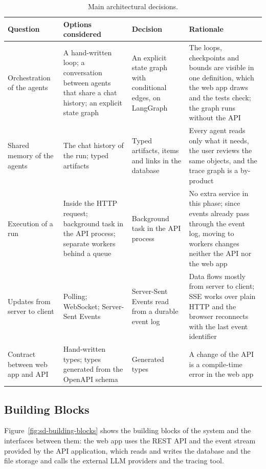 \begin{table}[H]
    \centering
    \caption{Main architectural decisions.}
    \label{tab:sd-adr}
    \begin{tabularx}{\linewidth}{|p{2.4cm}|X|X|X|}
        \hline
        \textbf{Question} & \textbf{Options considered} & \textbf{Decision} & \textbf{Rationale} \\
        \hline
        Orchestration of the agents & A hand-written loop; a conversation between agents that share a chat history; an explicit state graph & An explicit state graph with conditional edges, on LangGraph & The loops, checkpoints and bounds are visible in one definition, which the web app draws and the tests check; the graph runs without the API \\
        \hline
        Shared memory of the agents & The chat history of the run; typed artifacts & Typed artifacts, items and links in the database & Every agent reads only what it needs, the user reviews the same objects, and the trace graph is a by-product \\
        \hline
        Execution of a run & Inside the HTTP request; background task in the API process; separate workers behind a queue & Background task in the API process & No extra service in this phase; since events already pass through the event log, moving to workers changes neither the API nor the web app \\
        \hline
        Updates from server to client & Polling; WebSocket; Server-Sent Events & Server-Sent Events read from a durable event log & Data flows mostly from server to client; SSE works over plain HTTP and the browser reconnects with the last event identifier \\
        \hline
        Contract between web app and API & Hand-written types; types generated from the OpenAPI schema & Generated types & A change of the API is a compile-time error in the web app \\
        \hline
    \end{tabularx}
\end{table}

\subsection{Building Blocks}
\label{sec:sd-building-blocks}

Figure~\ref{fig:sd-building-blocks} shows the building blocks of the system and the interfaces between them: the web app uses the REST API and the event stream provided by the API application, which reads and writes the database and the file storage and calls the external LLM providers and the tracing tool.

